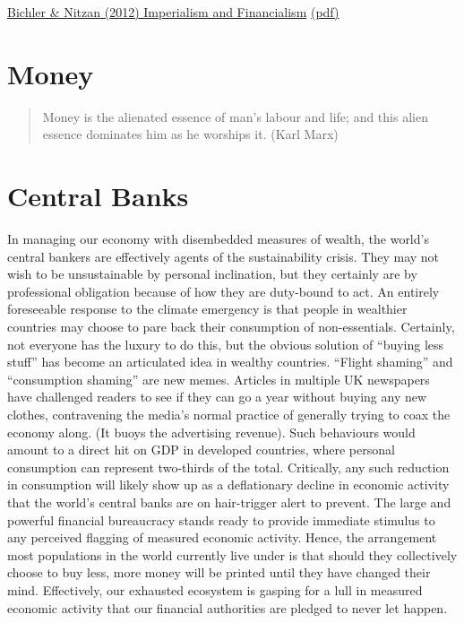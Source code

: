 \documentclass[
]{book}
\begin{document}
\href{http://bnarchives.yorku.ca/329/}{Bichler \& Nitzan (2012) Imperialism and Financialism}
\href{pdf/Bichler_Nitzan_2012_Imperialism_and_Financialism.pdf}{(pdf)}

\hypertarget{money-1}{%
\chapter{Money}\label{money-1}}

\begin{quote}
Money is the alienated essence of man's labour and life; and this alien essence dominates him as he worships it. (Karl Marx)
\end{quote}

\hypertarget{central-banks-1}{%
\chapter{Central Banks}\label{central-banks-1}}

In managing our economy with disembedded measures of wealth,
the world's central bankers are effectively agents of the sustainability crisis. They may not
wish to be unsustainable by personal inclination, but they certainly are by professional
obligation because of how they are duty-bound to act.
An entirely foreseeable response to the climate emergency is that people in wealthier
countries may choose to pare back their consumption of non-essentials. Certainly, not
everyone has the luxury to do this, but the obvious solution of ``buying less stuff'' has become
an articulated idea in wealthy countries. ``Flight shaming'' and ``consumption shaming'' are new
memes. Articles in multiple UK newspapers have challenged readers to see if they can go a
year without buying any new clothes, contravening the media's normal practice of generally
trying to coax the economy along. (It buoys the advertising revenue).
Such behaviours would amount to a direct hit on GDP in developed countries, where personal
consumption can represent two-thirds of the total. Critically, any such reduction in
consumption will likely show up as a deflationary decline in economic activity that the world's
central banks are on hair-trigger alert to prevent. The large and powerful financial
bureaucracy stands ready to provide immediate stimulus to any perceived flagging of
measured economic activity.
Hence, the arrangement most populations in the world currently live under is that should they
collectively choose to buy less, more money will be printed until they have changed their
mind. Effectively, our exhausted ecosystem is gasping for a lull in measured economic activity
that our financial authorities are pledged to never let happen.
\end{document}
